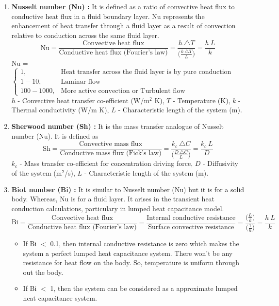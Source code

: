 \documentclass[a4paper, 12 pt]{article}
\begin{document}
\begin{enumerate}
    \item \textbf{Nusselt number (Nu) :} It is defined as a ratio of convective heat flux to conductive heat flux in a fluid boundary layer. Nu represents the enhancement of heat transfer through a fluid layer as  a result of convection relative to conduction across the same fluid layer. $$\text{Nu}=\frac{\text{Convective heat flux}}{\text{Conductive heat flux (Fourier's law)}}=\frac{ h\ \triangle T }{\big(\frac{k\ \triangle T}{L}\big)}=\frac{h\ L}{k}$$ Nu = 
    $\begin{cases} 
    1,& \text{Heat transfer across the fluid layer is by pure conduction}\\
    1 - 10, & \text{Laminar flow} \\
    100 - 1000,&\text{More active convection or Turbulent flow}  
    \end{cases}$
    \\[2 mm] $h$ - Convective heat transfer co-efficient (W/m$^2$ K), $T$ - Temperature (K), $k$ - Thermal conductivity (W/m K), $L$ - Characteristic length of the system (m).
    
    \item \textbf{Sherwood number (Sh) :} It is the mass transfer analogue of Nusselt number (Nu). It is defined as $$\text{Sh}=\frac{\text{Convective mass flux}}{\text{Conductive mass flux (Fick's law)}}=\frac{ k_c\ \triangle C }{\big(\frac{D\ \triangle C}{L}\big)}=\frac{k_c\ L}{D}$$
    $k_c$ - Mass transfer co-efficient for concentration driving force, $D$ - Diffusivity of the system (m$^2$/s), $L$ - Characteristic length of the system (m).
    
    \item \textbf{Biot number (Bi) :} It is similar to Nusselt number (Nu) but it is for a solid body. Whereas, Nu is for a fluid layer. It arises in the transient heat conduction calculations, particulary in lumped heat capacitance model. $$\text{Bi}=\frac{\text{Convective heat flux}}{\text{Conductive heat flux (Fourier's law)}}=\frac{\text{Internal conductive resistance}}{\text{Surface convective resistance}}=\frac{\big( \frac{L}{k} \big)}{\big( \frac{1}{h} \big)}=\frac{h\ L}{k}$$
    \begin{itemize}
        \item If Bi $<$ 0.1, then internal conductive resistance is zero which makes the system a perfect lumped heat capacitance system. There won't be any resistance for heat flow on the body. So, temperature is uniform through out the body. 
        
        \item If Bi $<$ 1, then the system can be considered as a approximate lumped heat capacitance system. 
        

\end{itemize}
\end{enumerate}
\end{document}
